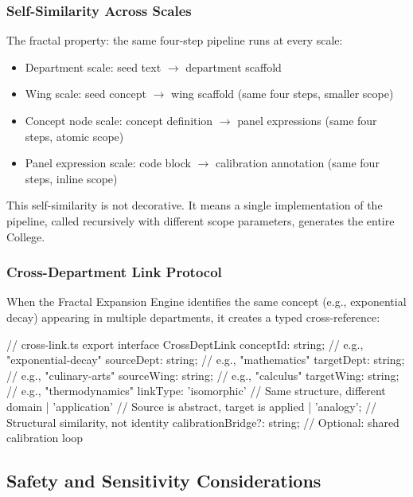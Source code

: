 \documentclass[11pt,letterpaper]{article}
\begin{document}
\subsubsection{Self-Similarity Across Scales}

The fractal property: the same four-step pipeline runs at every scale:
\begin{itemize}[leftmargin=1.5em]
  \item Department scale: seed text $\rightarrow$ department scaffold
  \item Wing scale: seed concept $\rightarrow$ wing scaffold (same four steps, smaller scope)
  \item Concept node scale: concept definition $\rightarrow$ panel expressions (same four steps, atomic scope)
  \item Panel expression scale: code block $\rightarrow$ calibration annotation (same four steps, inline scope)
\end{itemize}

This self-similarity is not decorative. It means a single implementation of the pipeline, called recursively with different scope parameters, generates the entire College.

\subsubsection{Cross-Department Link Protocol}

When the Fractal Expansion Engine identifies the same concept (e.g., exponential decay) appearing in multiple departments, it creates a typed cross-reference:

\begin{asciibox}
// cross-link.ts
export interface CrossDeptLink {
  conceptId: string;           // e.g., "exponential-decay"
  sourceDept: string;          // e.g., "mathematics"
  targetDept: string;          // e.g., "culinary-arts"
  sourceWing: string;          // e.g., "calculus"
  targetWing: string;          // e.g., "thermodynamics"
  linkType: 'isomorphic'       // Same structure, different domain
           | 'application'     // Source is abstract, target is applied
           | 'analogy';        // Structural similarity, not identity
  calibrationBridge?: string;  // Optional: shared calibration loop
}
\end{asciibox}

\subsection{Safety and Sensitivity Considerations}
\end{document}
